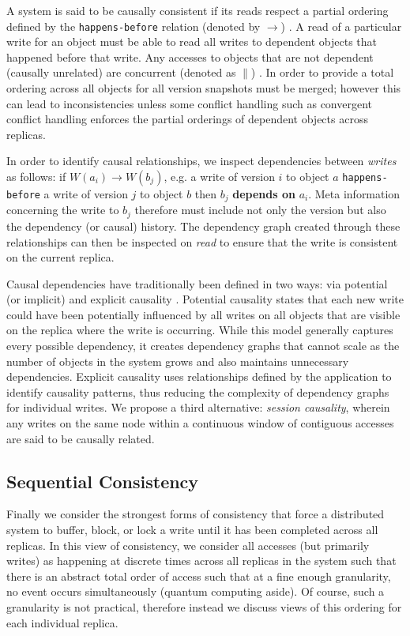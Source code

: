 \documentclass[letterpaper,twocolumn,10pt]{article}
\begin{document}
A system is said to be causally consistent if its reads respect a partial ordering defined by the \texttt{happens-before} relation (denoted by $\rightarrow$) \cite{lamport_time_1978}. A read of a particular write for an object must be able to read all writes to dependent objects that happened before that write. Any accesses to objects that are not dependent (causally unrelated) are concurrent (denoted as $\parallel$) \cite{schwarz_detecting_1994}. In order to provide a total ordering across all objects for all version snapshots must be merged; however this can lead to inconsistencies unless some conflict handling such as convergent conflict handling \cite{lloyd_dont_2011} enforces the partial orderings of dependent objects across replicas.

In order to identify causal relationships, we inspect dependencies between \textit{writes} as follows: if $W(a_i) \rightarrow W(b_j)$, e.g. a write of version $i$ to object $a$ \texttt{happens-before} a write of version $j$ to object $b$ then $b_j$ \textbf{depends on} $a_i$. Meta information concerning the write to $b_j$ therefore must include not only the version but also the dependency (or causal) history. The dependency graph created through these relationships can then be inspected on \textit{read} to ensure that the write is consistent on the current replica.

Causal dependencies have traditionally been defined in two ways: via potential (or implicit) and explicit causality \cite{bailis_potential_2012}. Potential causality states that each new write could have been potentially influenced by all writes on all objects that are visible on the replica where the write is occurring. While this model generally captures every possible dependency, it creates dependency graphs that cannot scale as the number of objects in the system grows and also maintains unnecessary dependencies. Explicit causality uses relationships defined by the application to identify causality patterns, thus reducing the complexity of dependency graphs for individual writes. We propose a third alternative: \textit{session causality}, wherein any writes on the same node within a continuous window of contiguous accesses are said to be causally related.

\subsection{Sequential Consistency}

Finally we consider the strongest forms of consistency that force a distributed system to buffer, block, or lock a write until it has been completed across all replicas. In this view of consistency, we consider all accesses (but primarily writes) as happening at discrete times across all replicas in the system such that there is an abstract total order of access such that at a fine enough granularity, no event occurs simultaneously (quantum computing aside). Of course, such a granularity is not practical, therefore instead we discuss views of this ordering for each individual replica.
\end{document}
